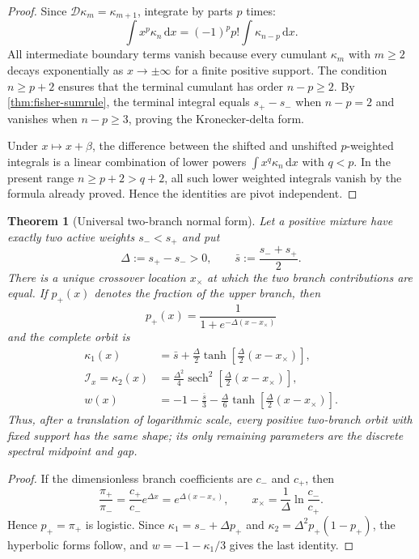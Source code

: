 \documentclass[aps,prd,preprint,onecolumn,nofootinbib,superscriptaddress,showkeys]{revtex4-2}
\numberwithin{equation}{section}
\theoremstyle{definition}
\theoremstyle{plain}
\newtheorem{theorem}{Theorem}[section]
\newcommand{\dd}{\mathrm d}
\newcommand{\Dil}{\mathscr D}
\begin{document}
\begin{proof}
Since \(\Dil\kappa_m=\kappa_{m+1}\), integrate by parts \(p\) times:
\[
\int x^p\kappa_n\,\dd x
=
(-1)^p p!\int\kappa_{n-p}\,\dd x.
\]
All intermediate boundary terms vanish because every cumulant \(\kappa_m\) with \(m\ge2\) decays exponentially as \(x\to\pm\infty\) for a finite positive support.  The condition \(n\ge p+2\) ensures that the terminal cumulant has order \(n-p\ge2\).  By \cref{thm:fisher-sumrule}, the terminal integral equals \(s_+-s_-\) when \(n-p=2\) and vanishes when \(n-p\ge3\), proving the Kronecker-delta form.

Under \(x\mapsto x+\beta\), the difference between the shifted and unshifted \(p\)-weighted integrals is a linear combination of lower powers \(\int x^q\kappa_n\,\dd x\) with \(q<p\).  In the present range \(n\ge p+2>q+2\), all such lower weighted integrals vanish by the formula already proved.  Hence the identities are pivot independent.
\end{proof}

\begin{theorem}[Universal two-branch normal form]\label{thm:two-branch-normal-form}
Let a positive mixture have exactly two active weights $s_-<s_+$ and put
\[
\Delta:=s_+-s_->0,
\qquad
\bar s:=\frac{s_-+s_+}{2}.
\]
There is a unique crossover location $x_\times$ at which the two branch contributions are equal.  If $p_+(x)$ denotes the fraction of the upper branch, then
\begin{equation}
\boxed{
p_+(x)=\frac{1}{1+e^{-\Delta(x-x_\times)}}
}
\end{equation}
and the complete orbit is
\begin{equation}
\boxed{
\begin{aligned}
\kappa_1(x)
&=\bar s+\frac{\Delta}{2}\tanh\!\left[\frac{\Delta}{2}(x-x_\times)\right],\\
\mathcal I_x=\kappa_2(x)
&=\frac{\Delta^2}{4}\operatorname{sech}^2\!\left[\frac{\Delta}{2}(x-x_\times)\right],\\
w(x)
&=-1-\frac{\bar s}{3}-\frac{\Delta}{6}\tanh\!\left[\frac{\Delta}{2}(x-x_\times)\right].
\end{aligned}
}
\end{equation}
Thus, after a translation of logarithmic scale, every positive two-branch orbit with fixed support has the same shape; its only remaining parameters are the discrete spectral midpoint and gap.
\end{theorem}

\begin{proof}
If the dimensionless branch coefficients are $c_-$ and $c_+$, then
\[
\frac{\pi_+}{\pi_-}
=\frac{c_+}{c_-}e^{\Delta x}
=e^{\Delta(x-x_\times)},
\qquad
x_\times=\frac1{\Delta}\ln\frac{c_-}{c_+}.
\]
Hence $p_+=\pi_+$ is logistic.  Since $\kappa_1=s_-+\Delta p_+$ and $\kappa_2=\Delta^2p_+(1-p_+)$, the hyperbolic forms follow, and $w=-1-\kappa_1/3$ gives the last identity.
\end{proof}
\end{document}

